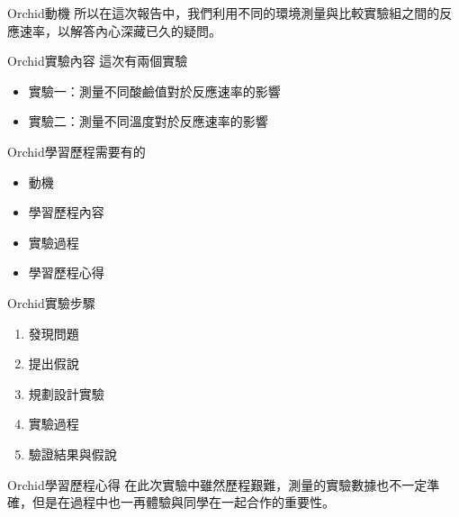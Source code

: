 \documentclass{article}
\begin{document}
\begin{large}
\begin{boxpar}{Orchid}{動機}
    所以在這次報告中，我們利用不同的環境測量與比較實驗組之間的反應速率，以解答內心深藏已久的疑問。
\end{boxpar}
\begin{boxpar}{Orchid}{實驗內容}
    這次有兩個實驗
    \begin{itemize}
        \item 實驗一：測量不同酸鹼值對於反應速率的影響
        \item 實驗二：測量不同溫度對於反應速率的影響
    \end{itemize}
\end{boxpar}
\begin{boxpar}{Orchid}{學習歷程需要有的}
    \begin{itemize}
\item 動機
\item 學習歷程內容
\item 實驗過程
\item 學習歷程心得
    \end {itemize}
\end{boxpar}
\begin{boxpar}{Orchid}{實驗步驟}
    \begin{enumerate}
\item 發現問題
\item 提出假說
\item 規劃設計實驗
\item 實驗過程
\item 驗證結果與假說
    \end {enumerate}
\end{boxpar}
\begin{boxpar}{Orchid}{學習歷程心得}
    在此次實驗中雖然歷程艱難，測量的實驗數據也不一定準確，但是在過程中也一再體驗與同學在一起合作的重要性。
\end{boxpar}
\end{large}
\end{document}
